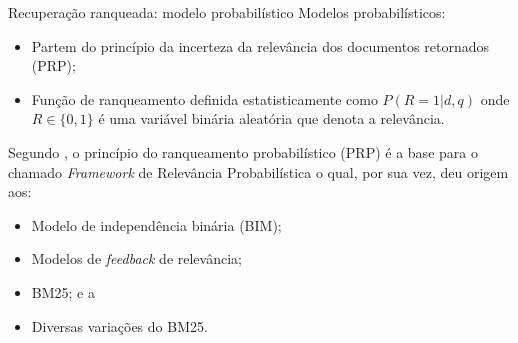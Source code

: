 \documentclass[%
  10pt,%
  aspectratio = 169,%
  compress,%
  t,%
]{beamer}%
\begin{document}
    \begin{frame}[fragile = singleslide]{}{Recuperação ranqueada: modelo probabilístico}
        Modelos probabilísticos:
        \begin{itemize}
            \item Partem do princípio da incerteza da relevância dos documentos retornados (PRP);
            \item Função de ranqueamento definida estatisticamente como $P(R = 1| d,q)$ onde $R \in \{0, 1\}$ é uma variável binária aleatória que denota a relevância.
        \end{itemize}
        
        Segundo \cite[p.~333]{robertson_probabilistic_2010}, o 
        princípio do ranqueamento probabilístico (PRP) é a base para o chamado \textit{Framework} de Relevância Probabilística o qual, por sua vez, deu origem aos: 
        \begin{itemize}
            \item Modelo de independência binária (BIM);
            \item Modelos de \textit{feedback} de relevância;
            \item BM25; e a
            \item Diversas variações do BM25.
        \end{itemize}
    \end{frame}
    
\end{document}
